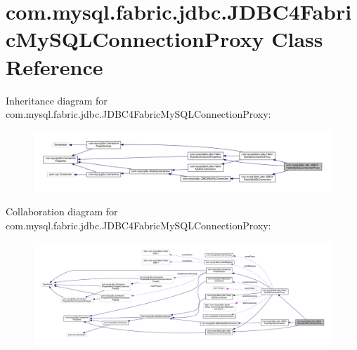 \hypertarget{classcom_1_1mysql_1_1fabric_1_1jdbc_1_1_j_d_b_c4_fabric_my_s_q_l_connection_proxy}{}\section{com.\+mysql.\+fabric.\+jdbc.\+J\+D\+B\+C4\+Fabric\+My\+S\+Q\+L\+Connection\+Proxy Class Reference}
\label{classcom_1_1mysql_1_1fabric_1_1jdbc_1_1_j_d_b_c4_fabric_my_s_q_l_connection_proxy}


Inheritance diagram for com.\+mysql.\+fabric.\+jdbc.\+J\+D\+B\+C4\+Fabric\+My\+S\+Q\+L\+Connection\+Proxy\+:\nopagebreak
\begin{figure}[H]
\begin{center}
\leavevmode
\includegraphics[width=350pt]{classcom_1_1mysql_1_1fabric_1_1jdbc_1_1_j_d_b_c4_fabric_my_s_q_l_connection_proxy__inherit__graph}
\end{center}
\end{figure}


Collaboration diagram for com.\+mysql.\+fabric.\+jdbc.\+J\+D\+B\+C4\+Fabric\+My\+S\+Q\+L\+Connection\+Proxy\+:\nopagebreak
\begin{figure}[H]
\begin{center}
\leavevmode
\includegraphics[width=350pt]{classcom_1_1mysql_1_1fabric_1_1jdbc_1_1_j_d_b_c4_fabric_my_s_q_l_connection_proxy__coll__graph}
\end{center}
\end{figure}
